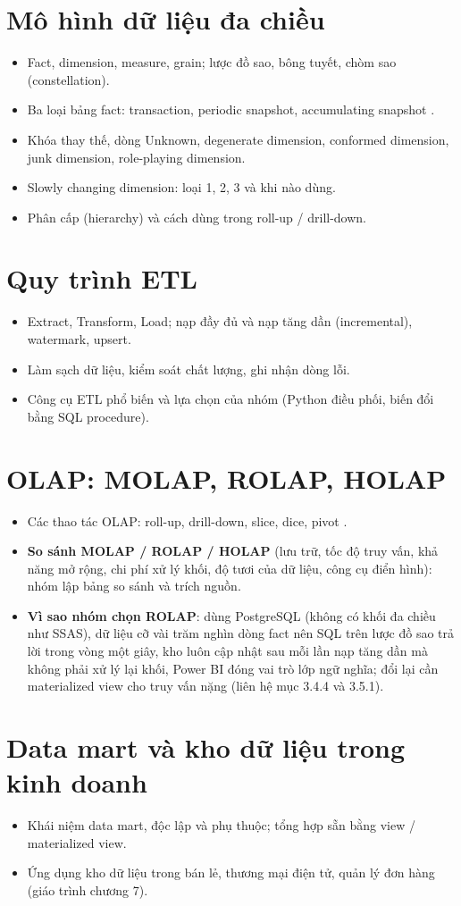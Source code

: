 \section{Mô hình dữ liệu đa chiều}
\begin{itemize}
  \item Fact, dimension, measure, grain; lược đồ sao, bông tuyết, chòm sao (constellation).
  \item Ba loại bảng fact: transaction, periodic snapshot, accumulating snapshot \cite{kimball2013}.
  \item Khóa thay thế, dòng Unknown, degenerate dimension, conformed dimension, junk dimension, role-playing dimension.
  \item Slowly changing dimension: loại 1, 2, 3 và khi nào dùng.
  \item Phân cấp (hierarchy) và cách dùng trong roll-up / drill-down.
\end{itemize}

\section{Quy trình ETL}
\begin{itemize}
  \item Extract, Transform, Load; nạp đầy đủ và nạp tăng dần (incremental), watermark, upsert.
  \item Làm sạch dữ liệu, kiểm soát chất lượng, ghi nhận dòng lỗi.
  \item Công cụ ETL phổ biến và lựa chọn của nhóm (Python điều phối, biến đổi bằng SQL procedure).
\end{itemize}

\section{OLAP: MOLAP, ROLAP, HOLAP}
\begin{itemize}
  \item Các thao tác OLAP: roll-up, drill-down, slice, dice, pivot \cite{chaudhuri1997,codd1993}.
  \item \textbf{So sánh MOLAP / ROLAP / HOLAP} (lưu trữ, tốc độ truy vấn, khả năng mở rộng, chi phí xử lý khối, độ tươi của dữ liệu, công cụ điển hình): nhóm lập bảng so sánh và trích nguồn.
  \item \textbf{Vì sao nhóm chọn ROLAP}: dùng PostgreSQL (không có khối đa chiều như SSAS), dữ liệu cỡ vài trăm nghìn dòng fact nên SQL trên lược đồ sao trả lời trong vòng một giây, kho luôn cập nhật sau mỗi lần nạp tăng dần mà không phải xử lý lại khối, Power BI đóng vai trò lớp ngữ nghĩa; đổi lại cần materialized view cho truy vấn nặng (liên hệ mục 3.4.4 và 3.5.1).
\end{itemize}

\section{Data mart và kho dữ liệu trong kinh doanh}
\begin{itemize}
  \item Khái niệm data mart, độc lập và phụ thuộc; tổng hợp sẵn bằng view / materialized view.
  \item Ứng dụng kho dữ liệu trong bán lẻ, thương mại điện tử, quản lý đơn hàng (giáo trình chương 7).
\end{itemize}
